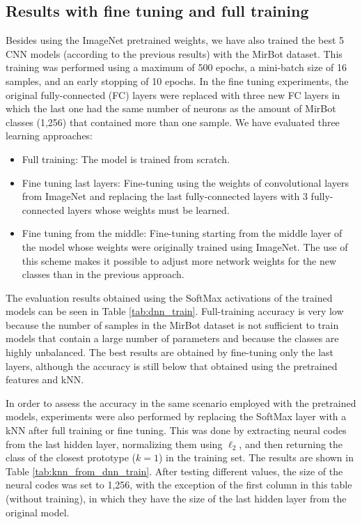 \documentclass[final, twocolumn]{elsarticle}
\begin{document}
\subsection{Results with fine tuning and full training}

Besides using the ImageNet pretrained weights, we have also trained the best 5 CNN models (according to the previous results) with the MirBot dataset. This training was performed using a maximum of 500 epochs, a mini-batch size of 16 samples, and an early stopping of 10 epochs. In the fine tuning experiments, the original fully-connected (FC) layers were replaced with three new FC layers in which the last one had the same number of neurons as the amount of MirBot classes (1,256) that contained more than one sample. We have evaluated three learning approaches:

\begin{itemize}
\item Full training: The model is trained from scratch.
\item Fine tuning last layers: Fine-tuning using the weights of convolutional layers from ImageNet and replacing the last fully-connected layers with 3 fully-connected layers whose weights must be learned.
\item Fine tuning from the middle: Fine-tuning starting from the middle layer of the model whose weights were originally trained using ImageNet. The use of this scheme makes it possible to adjust more network weights for the new classes than in the previous approach.
\end{itemize}

The evaluation results obtained using the SoftMax activations of the trained models can be seen in Table \ref{tab:dnn_train}. Full-training accuracy is very low because the number of samples in the MirBot dataset is not sufficient to train models that contain a large number of parameters and because the classes are highly unbalanced. The best results are obtained by fine-tuning only the last layers, although the accuracy is still below that obtained using the pretrained features and kNN.

In order to assess the accuracy in the same scenario employed with the pretrained models, experiments were also performed by replacing the SoftMax layer with a kNN after full training or fine tuning. This was done by extracting neural codes from the last hidden layer, normalizing them using $\ell_2$, and then returning the class of the closest prototype ($k=1$) in the training set. The results are shown in Table \ref{tab:knn_from_dnn_train}. After testing different values, the size of the neural codes was set to 1,256, with the exception of the first column in this table (without training), in which they have the size of the last hidden layer from the original model.
\end{document}
